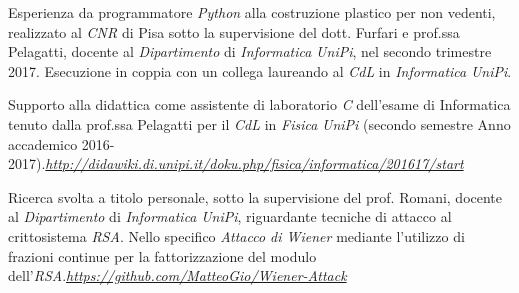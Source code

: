 \documentclass[10pt]{article} %
\begin{document}
%    

Esperienza da programmatore \textit{Python} alla costruzione plastico per non vedenti, realizzato al \textit{CNR} di Pisa sotto la supervisione del dott. Furfari e prof.ssa Pelagatti, docente al \textit{Dipartimento} di \textit{Informatica} \textit{UniPi}, nel secondo trimestre 2017. Esecuzione in coppia con un collega laureando al \textit{CdL} in \textit{Informatica} \textit{UniPi}.

\medskip
Supporto alla didattica come assistente di laboratorio \textit{C} dell'esame di Informatica tenuto dalla prof.ssa Pelagatti per il \textit{CdL} in \textit{Fisica} \textit{UniPi} (secondo semestre Anno accademico 2016-2017).\hfill\href{http://didawiki.di.unipi.it/doku.php/fisica/informatica/201617/start}{\textit{http://didawiki.di.unipi.it/doku.php/fisica/informatica/201617/start}}

\medskip
Ricerca svolta a titolo personale, sotto la supervisione del prof. Romani, docente al \textit{Dipartimento} di \textit{Informatica} \textit{UniPi}, riguardante tecniche di attacco al crittosistema \textit{RSA}. Nello specifico \textit{Attacco di Wiener} mediante l'utilizzo di frazioni continue per la fattorizzazione del modulo dell'\textit{RSA}.\hfill\href{https://github.com/MatteoGio/Wiener-Attack}{\textit{https://github.com/MatteoGio/Wiener-Attack}}




\end{document}
